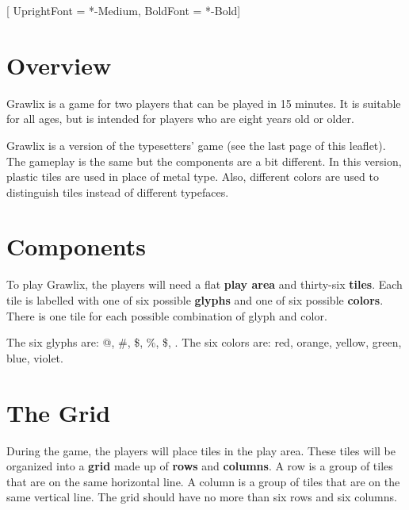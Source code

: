 \documentclass[a4paper, 10pt, notumble]{leaflet}
\makeatletter
\newcommand{\smallat}{{\setmainfont{Comic Neue-Bold} \Large @}}
\newcommand{\smallpound}{{\setmainfont{Comic Neue-Bold} \large \#}}
\newcommand{\smalldollar}{{\setmainfont{Comic Neue-Bold} \large \$}}
\newcommand{\smallpercent}{{\setmainfont{Comic Neue-Bold} \large \%}}
\newcommand{\smallampersand}{{\setmainfont{Comic Neue-Bold} \large \$}}
\newcommand{\smallasterisk}{{\setmainfont{Quicksand-Bold} \Huge \raisebox{-0.25ex}{\textasteriskcentered{}}}}
\makeatother
\begin{document}
\newpage
\setmainfont{Quicksand}[
	UprightFont = *-Medium,
	BoldFont = *-Bold]
\raggedright

\section{Overview}
Grawlix is a game for two players that can be played in 15  minutes. It is suitable for all ages, but is intended for players who are eight years old or older.

Grawlix is a version of the typesetters' game (see the last page of this leaflet). The gameplay is the same but the components are a bit different. In this version, plastic tiles are used in place of metal type. Also, different colors are used to distinguish tiles instead of different typefaces.

\section{Components}
To play Grawlix, the players will need a flat \textbf{play area} and thirty-six \textbf{tiles}. Each tile is labelled with one of six possible \textbf{glyphs} and one of six possible \textbf{colors}.  There is one tile for each possible combination of glyph and color.

The six glyphs are: \smallat, \smallpound, \smalldollar, \smallpercent, \smallampersand, \smallasterisk. The six colors are: red, orange, yellow, green, blue, violet.

\begin{figure}[h]
\centering
{}

\end{figure}

\newpage

\section{The Grid}
During the game, the players will place tiles in the play area. These tiles will be organized into a \textbf{grid} made up of \textbf{rows} and \textbf{columns}. A row is a group of tiles that are on the same horizontal line.  A column is a group of tiles that are on the same vertical line. The grid should have no more than six rows and six columns.
\end{document}

